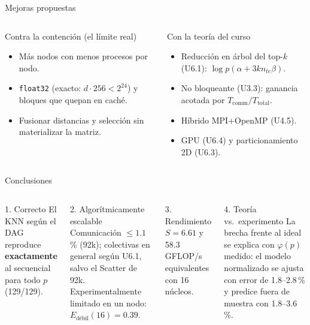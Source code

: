 \documentclass[aspectratio=169,10pt]{beamer}
\newcommand{\nte}{n_{te}}
\newcommand{\tsub}[1]{T_{\mathrm{#1}}}
\renewenvironment{block}[1]{\begin{caja}[cajagris]{#1}}{\end{caja}}
\renewenvironment{exampleblock}[1]{\begin{caja}[cajaverde]{#1}}{\end{caja}}
\renewenvironment{alertblock}[1]{\begin{caja}[cajaroja]{#1}}{\end{caja}}
\begin{document}
\begin{frame}{Mejoras propuestas}
\begin{columns}[T]
\begin{block}{Contra la contención (el límite real)}
\begin{itemize}\setlength{\itemsep}{1pt}\small
\item Más nodos con menos procesos por nodo.
\item \texttt{float32} (exacto: $d\cdot256<2^{24}$) y bloques que quepan en caché.
\item Fusionar distancias y selección sin materializar la matriz.
\end{itemize}
\end{block}
\begin{block}{Con la teoría del curso}
\begin{itemize}\setlength{\itemsep}{1pt}\small
\item Reducción en árbol del top-$k$ (U6.1): $\log p(\alpha+3k\nte\beta)$.
\item No bloqueante (U3.3): ganancia acotada por $\tsub{comm}/\tsub{total}$.
\item Híbrido MPI+OpenMP (U4.5).
\item GPU (U6.4) y particionamiento 2D (U6.3).
\end{itemize}
\end{block}
\end{columns}
\end{frame}

\begin{frame}{Conclusiones}
\begin{columns}[T]
\begin{exampleblock}{1. Correcto}
El KNN según el DAG reproduce \textbf{exactamente} al secuencial para todo $p$ (129/129).
\end{exampleblock}
\begin{exampleblock}{2. Algorítmicamente escalable}
Comunicación $\le1.1$\,\% (92k); colectivas en general según U6.1, salvo el Scatter de 92k. Experimentalmente limitado en un nodo: $E_{\text{débil}}(16)=0.39$.
\end{exampleblock}
\begin{block}{3. Rendimiento}
$S=6.61$ y 58.3\,GFLOP/s equivalentes con 16 núcleos.
\end{block}
\begin{alertblock}{4. Teoría vs.\ experimento}
La brecha frente al ideal se explica con $\varphi(p)$ medido: el modelo normalizado se ajusta con error de 1.8--2.8\,\% y predice fuera de muestra con 1.8--3.6\,\%.
\end{alertblock}
\end{columns}
\end{frame}
\end{document}
